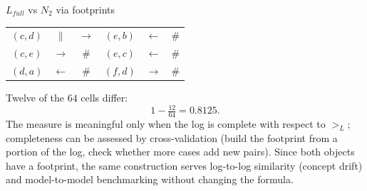 \begin{examplebox}{$L_{full}$ vs $N_2$ via footprints}
\begin{center}
\begin{tabular}{ccc@{\qquad}ccc}
$(c,d)$ & $\|$ & $\to$ & $(e,b)$ & $\leftarrow$ & $\#$ \\
$(c,e)$ & $\to$ & $\#$ & $(e,c)$ & $\leftarrow$ & $\#$ \\
$(d,a)$ & $\leftarrow$ & $\#$ & $(f,d)$ & $\to$ & $\#$ \\
\bottomrule
\end{tabular}
\end{center}
Twelve of the $64$ cells differ:
$$1 - \tfrac{12}{64} = 0.8125.$$
The measure is meaningful only when the log is complete with respect to $>_L$; completeness can be assessed by cross-validation (build the footprint from a portion of the log, check whether more cases add new pairs). Since both objects have a footprint, the same construction serves log-to-log similarity (concept drift) and model-to-model benchmarking without changing the formula.
\end{examplebox}

